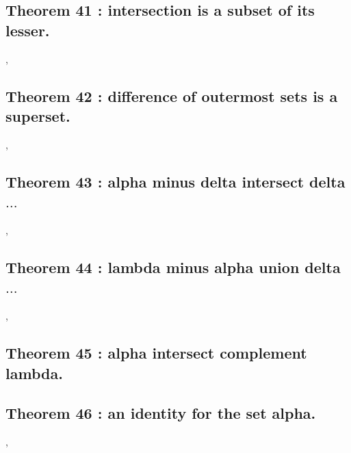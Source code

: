 \documentclass[preview]{standalone}
\begin{document}
\subsection[Intersection is a subset of its lesser.]
    {
        \color{section}Theorem 41 \color{black} : intersection is a subset of its lesser.
    }

\sep


\subsection[Difference of outermost sets is a superset.]
    {
        \color{section}Theorem 42 \color{black} : difference of outermost sets is a superset.
    }

\sep
\pagebreak


\subsection[Alpha minus delta intersect delta $\dots$]
    {
        \color{section}Theorem 43 \color{black} : alpha minus delta intersect delta $\dots$
    }

\sep
\pagebreak


\subsection[Lambda minus alpha union delta $\dots$]
    {
        \color{section}Theorem 44 \color{black} : lambda minus alpha union delta $\dots$
    }

\sep


\subsection[Alpha intersect complement lambda.]
    {
        \color{section}Theorem 45 \color{black} : alpha intersect complement lambda.
    }

\pagebreak


\subsection[An identity for the set alpha.]
    {
        \color{section}Theorem 46 \color{black} : an identity for the set alpha.
    }

\sep
\end{document}
